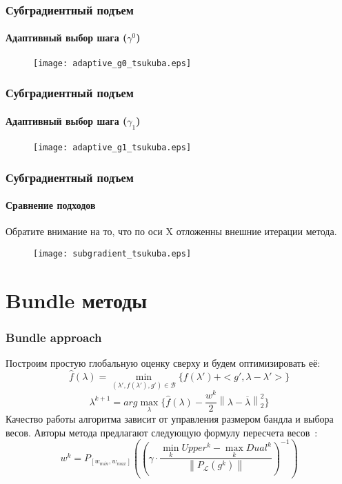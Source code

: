 \documentclass[smaller,unicode,hyperref={unicode=true}]{beamer}
\begin{document}
\begin{frame}
  \frametitle{Субградиентный подъем}
  \framesubtitle{Адаптивный выбор шага ($\gamma^0$)}
    \begin{figure}
      \texttt{[image: adaptive\_g0\_tsukuba.eps]}
    \end{figure}
\end{frame}

\begin{frame}
  \frametitle{Субградиентный подъем}
  \framesubtitle{Адаптивный выбор шага ($\gamma_1$)}
    \begin{figure}
      \texttt{[image: adaptive\_g1\_tsukuba.eps]}
    \end{figure}
\end{frame}

\begin{frame}
  \frametitle{Субградиентный подъем}
  \framesubtitle{Сравнение подходов}
  Обратите внимание на то, что по оси X отложенны внешние итерации метода.
    \begin{figure}
      \texttt{[image: subgradient\_tsukuba.eps]}
    \end{figure}
\end{frame}

\section{Bundle методы}
\begin{frame}
  \frametitle{Bundle approach}
  Построим простую глобальную оценку сверху и будем оптимизировать её:
    \begin{equation}
      \hat{f}(\lambda) = \min_{(\lambda{}', f(\lambda{}'), g{}') \in \mathcal{B}} \{f(\lambda{}') + <g{}', \lambda - \lambda{}'>\}
    \end{equation}
    \begin{equation}
      \lambda^{k + 1} = arg\max_{\lambda} \{\hat{f}(\lambda)  - \frac{w^k}{2} \left \| \lambda - \overline{\lambda} \right \|_2^2\}
    \end{equation}
    Качество работы алгоритма зависит от управления размером бандла и выбора весов. Авторы метода предлагают следующую формулу пересчета весов~\cite{Bundle}:
    \begin{equation}
       w^k = P_{[w_{min}, w_{max}]} \left ( \left (\gamma \cdot \frac{\min_{k}Upper^k - \max_{k} Dual^k}{\left \| P_{\mathcal{L}} ({g^k}) \right \|} \right )^{-1}\right )
    \end{equation}
\end{frame}
\end{document}
